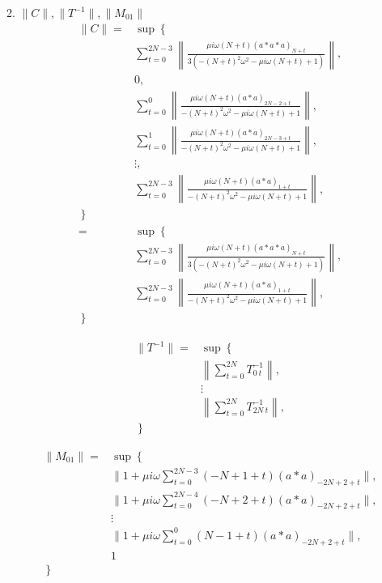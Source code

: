 \documentclass[11pt,a4paper,titlepage]{jsreport}
\theoremstyle{definition}
\begin{document}
2. $\|C\|, \|T^{-1}\|, \|M_{01}\|$
\begin{equation}
  \begin{split}
    \|C\| =& \sup \left\lbrace \right. \\
    &  \sum_{t=0}^{2N-3} \left\| \frac{\mu i \omega (N+t) (a*a*a)_{N+t}}{3(-(N+t)^2 \omega^2 - \mu i \omega (N+t)+ 1)} \right\|,\\
    & 0,\\
    & \sum_{t=0}^{0} \left\| \frac{ \mu i \omega (N+t) (a*a)_{2N-2 + t}}{-(N+t)^2 \omega^2 - \mu i \omega (N+t)+ 1} \right\|,\\
    & \sum_{t=0}^{1} \left\| \frac{ \mu i \omega (N+t) (a*a)_{2N-3 + t} }{-(N+t)^2 \omega^2 - \mu i \omega (N+t)+ 1}\right\|,\\
    & \vdots , \\
    & \sum_{t=0}^{2N-3} \left\| \frac{ \mu i \omega (N+t) (a*a)_{1 + t} }{-(N+t)^2 \omega^2 - \mu i \omega (N+t)+ 1}\right\|,\\
    \left. \right\rbrace \\
    = & \sup \left\lbrace \right. \\
    &  \sum_{t=0}^{2N-3} \left\| \frac{\mu i \omega (N+t) (a*a*a)_{N+t}}{3(-(N+t)^2 \omega^2 - \mu i \omega (N+t)+ 1)} \right\|,\\
    & \sum_{t=0}^{2N-3} \left\| \frac{ \mu i \omega (N+t) (a*a)_{1 + t} }{-(N+t)^2 \omega^2 - \mu i \omega (N+t)+ 1}\right\|,\\
    \left. \right\rbrace&
  \end{split}
\end{equation}


\begin{equation}
  \begin{split}
    \|T^{-1}\| =& \sup \left\lbrace \right. \\
    & \left\|\sum_{t=0}^{2N} T_{0\ t}^{-1}\right\|, \\
    & \vdots \\
    & \left\|\sum_{t=0}^{2N} T_{2N\ t}^{-1}\right\|, \\
    \left. \right\rbrace&
  \end{split}
\end{equation}

\begin{equation}
  \begin{split}
    \|M_{01}\| =& \sup \left\lbrace \right. \\
    &\| 1 + \mu i \omega \sum_{t=0}^{2N-3} (-N+1 + t) (a*a)_{-2N+2+t} \| , \\
    &\| 1 + \mu i \omega \sum_{t=0}^{2N-4} (-N+2 + t) (a*a)_{-2N+2+t} \| , \\
    & \vdots \\
    &\| 1 + \mu i \omega \sum_{t=0}^{0} (N-1 + t) (a*a)_{-2N+2+t} \| , \\
    & 1 \\
    \left. \right\rbrace&
  \end{split}
\end{equation}
\end{document}
